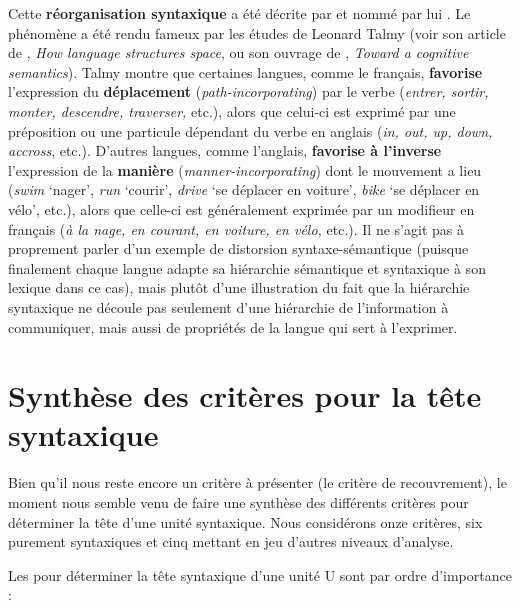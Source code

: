 {    Cette \textbf{réorganisation syntaxique} a été décrite par \citet[chapitre 131]{tesniere1959elements} et nommé par lui . Le phénomène a été rendu fameux par les études de Leonard Talmy (voir son article de \citeyear{almy1983language}, \textit{How language structures space}, ou son ouvrage de \citeyear{talmy2000toward}, \textit{Toward a cognitive semantics}). Talmy montre que certaines langues, comme le français, \textbf{favorise} l'expression du \textbf{déplacement} (\textit{path-incorporating}) par le verbe (\textit{entrer, sortir, monter, descendre, traverser,} etc.), alors que celui-ci est exprimé par une préposition ou une particule dépendant du verbe en anglais (\textit{in, out, up, down, accross}, etc.). D’autres langues, comme l’anglais, \textbf{favorise à l’inverse} l'expression de la \textbf{manière} (\textit{manner-incorporating}) dont le mouvement a lieu (\textit{swim} ‘nager’, \textit{run} ‘courir’, \textit{drive} ‘se déplacer en voiture’, \textit{bike} ‘se déplacer en vélo’, etc.), alors que celle-ci est généralement exprimée par un modifieur en français (\textit{à la nage, en courant, en voiture, en vélo,} etc.). Il ne s’agit pas à proprement parler d’un exemple de distorsion syntaxe-sémantique (puisque finalement chaque langue adapte sa hiérarchie sémantique et syntaxique à son lexique dans ce cas), mais plutôt d’une illustration du fait que la hiérarchie syntaxique ne découle pas seulement d’une hiérarchie de l’information à communiquer, mais aussi de propriétés de la langue qui sert à l’exprimer.
}


\section{Synthèse des critères pour la tête syntaxique}\label{sec:3.3.20}

Bien qu’il nous reste encore un critère à présenter (le critère de recouvrement), le moment nous semble venu de faire une synthèse des différents critères pour déterminer la tête d’une unité syntaxique. Nous considérons onze critères, six purement syntaxiques et cinq mettant en jeu d’autres niveaux d’analyse.

Les  pour déterminer la tête syntaxique d’une unité U sont par ordre d’importance :

